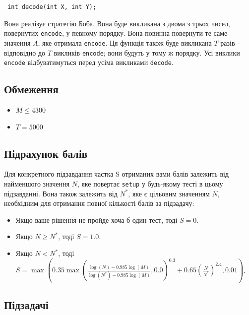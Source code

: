 \documentclass[12pt]{article}
\begin{document}
\begin{lstlisting}
 int decode(int X, int Y);
\end{lstlisting}

Вона реалізує стратегію Боба. Вона буде викликана з двома з трьох чисел, повернутих \texttt{encode}, у певному порядку. Вона повинна повернути те саме значення $A$, яке отримала \texttt{encode}. Ця функція також буде викликана $T$ разів -- відповідно до $T$ викликів \texttt{encode}; вони будуть у тому ж порядку. Усі виклики \texttt{encode} відбуватимуться перед усіма викликами \texttt{decode}.

\subsection{Обмеження}

\begin{itemize}
\item $M \leq 4300$
\item $T = 5000$
\end{itemize}

\subsection{Підрахунок балів}

Для конкретного підзавдання частка S отриманих вами балів залежить від найменшого значення $N$, яке повертає \texttt{setup} у будь-якому тесті в цьому підзавданні. Вона також залежить від $N^*$, яке є цільовим значенням $N$, необхідним для отримання повної кількості балів за підзадачу:

\begin{itemize}
\item Якщо ваше рішення не пройде хоча б один тест, тоді $S = 0$.
\item Якщо $N \geq N^*$, тоді $S = 1.0$.
\item Якщо $N < N^*$, тоді $S = \max\left(0.35 \max\left(\frac{\log(N) - 0.985 \log(M)}{\log(N^*) - 0.985 \log(M)}, 0.0\right)^{0.3} + 0.65 \left(\frac{N}{N^*}\right)^{2.4}, 0.01\right)$.
\end{itemize}

\subsection{Підзадачі}
\end{document}
